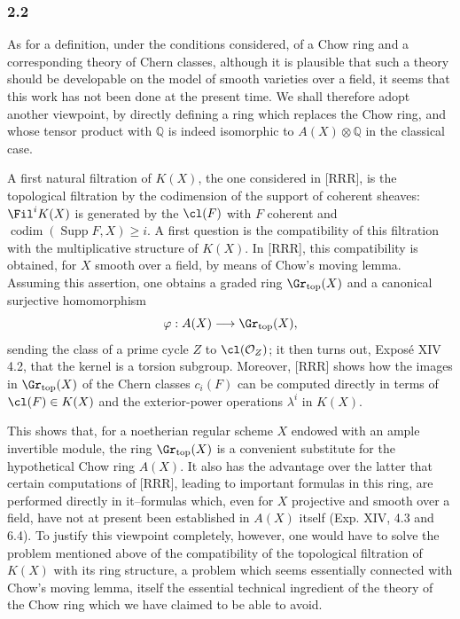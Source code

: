 \subsubsection*{2.2}
As for a definition, under the conditions considered, of a Chow ring and a corresponding theory of Chern classes, although it is plausible that such a theory should be developable on the model of smooth varieties over a field, it seems that this work has not been done at the present time. We shall therefore adopt another viewpoint, by directly defining a ring which replaces the Chow ring, and whose tensor product with $\mathbb Q$ is indeed isomorphic to $A(X)\otimes\mathbb Q$ in the classical case.

A first natural filtration of $K(X)$, the one considered in [RRR], is the topological filtration by the codimension of the support of coherent sheaves: $\Fil^iK(X)$ is generated by the $\cl(F)$ with $F$ coherent and $\operatorname{codim}(\operatorname{Supp}F,X)\ge i$. A first question is the compatibility of this filtration with the multiplicative structure of $K(X)$. In [RRR], this compatibility is obtained, for $X$ smooth over a field, by means of Chow's moving lemma. Assuming this assertion, one obtains a graded ring $\Gr_{\mathrm{top}}(X)$ and a canonical surjective homomorphism
\[
\varphi:A(X)\longrightarrow \Gr_{\mathrm{top}}(X),
\]
sending the class of a prime cycle $Z$ to $\cl(\mathcal O_Z)$; it then turns out, Exposé XIV 4.2, that the kernel is a torsion subgroup. Moreover, [RRR] shows how the images in $\Gr_{\mathrm{top}}(X)$ of the Chern classes $c_i(F)$ can be computed directly in terms of $\cl(F)\in K(X)$ and the exterior-power operations $\lambda^i$ in $K(X)$.

This shows that, for a noetherian regular scheme $X$ endowed with an ample invertible module, the ring $\Gr_{\mathrm{top}}(X)$ is a convenient substitute for the hypothetical Chow ring $A(X)$. It also has the advantage over the latter that certain computations of [RRR], leading to important formulas in this ring, are performed directly in it--formulas which, even for $X$ projective and smooth over a field, have not at present been established in $A(X)$ itself (Exp. XIV, 4.3 and 6.4). To justify this viewpoint completely, however, one would have to solve the problem mentioned above of the compatibility of the topological filtration of $K(X)$ with its ring structure, a problem which seems essentially connected with Chow's moving lemma, itself the essential technical ingredient of the theory of the Chow ring which we have claimed to be able to avoid.

